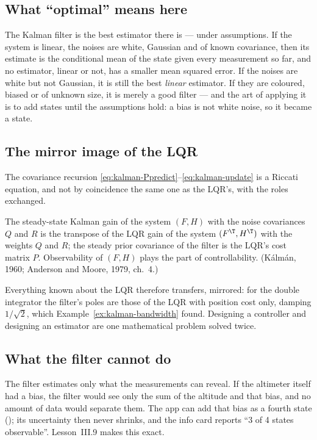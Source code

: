 \subsection{What \enquote{optimal} means here}
The Kalman filter is the best estimator there is — under assumptions. If the system is linear, the noises are white, Gaussian and of known covariance, then its estimate is the conditional mean of the state given every measurement so far, and no estimator, linear or not, has a smaller mean squared error. If the noises are white but not Gaussian, it is still the best \emph{linear} estimator. If they are coloured, biased or of unknown size, it is merely a good filter — and the art of applying it is to add states until the assumptions hold: a bias is not white noise, so it became a state.

\subsection{The mirror image of the LQR}
The covariance recursion \eqref{eq:kalman-Ppredict}–\eqref{eq:kalman-update} is a Riccati equation, and not by coincidence the same one as the LQR's, with the roles exchanged.

\begin{theorem}[Duality]
\label{thm:kalman-duality}
The steady-state Kalman gain of the system $(F, H)$ with the noise covariances $Q$ and $R$ is the transpose of the LQR gain of the system $(F^\T, H^\T)$ with the weights $Q$ and $R$; the steady prior covariance of the filter is the LQR's cost matrix $P$. Observability of $(F, H)$ plays the part of controllability. (Kálmán, 1960; Anderson and Moore, 1979, ch.~4.)
\end{theorem}

Everything known about the LQR therefore transfers, mirrored: for the double integrator the filter's poles are those of the LQR with position cost only, damping $1/\sqrt2$, which Example~\ref{ex:kalman-bandwidth} found. Designing a controller and designing an estimator are one mathematical problem solved twice.

\subsection{What the filter cannot do}
The filter estimates only what the measurements can reveal. If the altimeter itself had a bias, the filter would see only the sum of the altitude and that bias, and no amount of data would separate them. The app can add that bias as a fourth state (); its uncertainty then never shrinks, and the info card reports \enquote{3 of 4 states observable}. Lesson~III.9 makes this exact.

